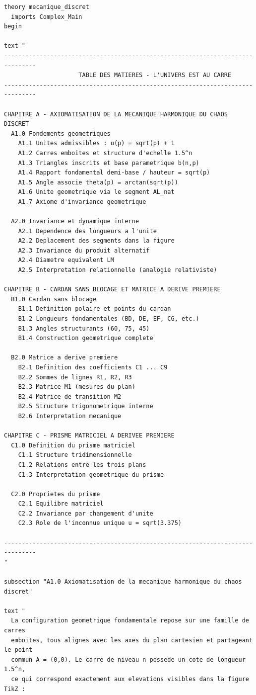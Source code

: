 \documentclass[12pt,a4paper]{article}
\theoremstyle{definition}
\theoremstyle{remark}
\begin{document}
\begin{verbatim}
theory mecanique_discret
  imports Complex_Main
begin

text "
-------------------------------------------------------------------------------
                     TABLE DES MATIERES - L'UNIVERS EST AU CARRE
-------------------------------------------------------------------------------

CHAPITRE A - AXIOMATISATION DE LA MECANIQUE HARMONIQUE DU CHAOS DISCRET
  A1.0 Fondements geometriques
    A1.1 Unites admissibles : u(p) = sqrt(p) + 1
    A1.2 Carres emboites et structure d'echelle 1.5^n
    A1.3 Triangles inscrits et base parametrique b(n,p)
    A1.4 Rapport fondamental demi-base / hauteur = sqrt(p)
    A1.5 Angle associe theta(p) = arctan(sqrt(p))
    A1.6 Unite geometrique via le segment AL_nat
    A1.7 Axiome d'invariance geometrique

  A2.0 Invariance et dynamique interne
    A2.1 Dependence des longueurs a l'unite
    A2.2 Deplacement des segments dans la figure
    A2.3 Invariance du produit alternatif
    A2.4 Diametre equivalent LM
    A2.5 Interpretation relationnelle (analogie relativiste)

CHAPITRE B - CARDAN SANS BLOCAGE ET MATRICE A DERIVE PREMIERE
  B1.0 Cardan sans blocage
    B1.1 Definition polaire et points du cardan
    B1.2 Longueurs fondamentales (BD, DE, EF, CG, etc.)
    B1.3 Angles structurants (60, 75, 45)
    B1.4 Construction geometrique complete

  B2.0 Matrice a derive premiere
    B2.1 Definition des coefficients C1 ... C9
    B2.2 Sommes de lignes R1, R2, R3
    B2.3 Matrice M1 (mesures du plan)
    B2.4 Matrice de transition M2
    B2.5 Structure trigonometrique interne
    B2.6 Interpretation mecanique

CHAPITRE C - PRISME MATRICIEL A DERIVEE PREMIERE
  C1.0 Definition du prisme matriciel
    C1.1 Structure tridimensionnelle
    C1.2 Relations entre les trois plans
    C1.3 Interpretation geometrique du prisme

  C2.0 Proprietes du prisme
    C2.1 Equilibre matriciel
    C2.2 Invariance par changement d'unite
    C2.3 Role de l'inconnue unique u = sqrt(3.375)

-------------------------------------------------------------------------------
"

subsection "A1.0 Axiomatisation de la mecanique harmonique du chaos discret"

text "
  La configuration geometrique fondamentale repose sur une famille de carres
  emboites, tous alignes avec les axes du plan cartesien et partageant le point
  commun A = (0,0). Le carre de niveau n possede un cote de longueur 1.5^n,
  ce qui correspond exactement aux elevations visibles dans la figure TikZ :


\end{verbatim}
\end{document}
